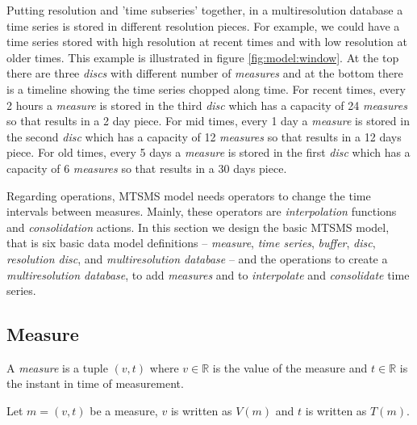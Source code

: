 Putting resolution and 'time subseries' together, in a multiresolution database a time series is stored in different resolution pieces. For example, we could have a time series stored with high resolution at recent times and with low resolution at older times. This example is illustrated in figure \ref{fig:model:window}. At the top there are three \emph{discs} with different number of \emph{measures} and at the bottom there is a timeline showing the time series chopped along time. For recent times, every 2 hours a \emph{measure} is stored in the third \emph{disc} which has a capacity of 24 \emph{measures} so that results in a 2 day piece. For mid times, every 1 day a  \emph{measure} is stored in the second \emph{disc} which has a capacity of 12 \emph{measures} so that results in a 12 days piece. For old times, every 5 days a  \emph{measure} is stored in the first \emph{disc} which has a capacity of 6 \emph{measures} so that results in a 30 days piece. 


Regarding operations, MTSMS model needs operators to change the time intervals between measures. Mainly, these operators are \emph{interpolation} functions and \emph{consolidation} actions. In this section we design the basic MTSMS model, that is six basic data model definitions -- \emph{measure}, \emph{time series}, \emph{buffer}, \emph{disc}, \emph{resolution disc}, and \emph{multiresolution database} -- and the operations to create a \emph{multiresolution database}, to add \emph{measures} and to \emph{interpolate} and \emph{consolidate} time series.



\subsection{Measure}

\begin{definition}[Measure]
  \label{def:measure}
  A \emph{measure} is a tuple $(v,t)$ where $v\in{\mathbb{R}}$ is the
  value of the measure and $t \in \mathbb{R}$ is the instant in time
  of measurement.
\end{definition}

Let $m=(v,t)$ be a measure, $v$ is written as $V(m)$ and $t$
is written as $T(m)$.

